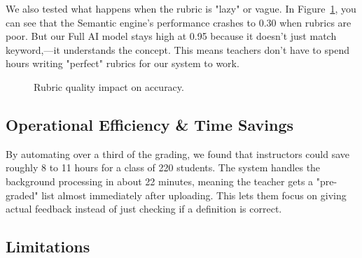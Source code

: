 \documentclass[conference]{IEEEtran}
\begin{document}
We also tested what happens when the rubric is "lazy" or vague. In Figure~\ref{fig:sensitivity}, you can see that the Semantic engine's performance crashes to 0.30 when rubrics are poor. But our Full AI model stays high at 0.95 because it doesn't just match keyword,—it understands the concept. This means teachers don't have to spend hours writing "perfect" rubrics for our system to work.
\vspace{-1ex}
\begin{figure}[H]
\centering
{}
\caption{Rubric quality impact on accuracy.}
\label{fig:sensitivity}
\end{figure}
\vspace{-1ex}

\subsection{Operational Efficiency & Time Savings}

By automating over a third of the grading, we found that instructors could save roughly 8 to 11 hours for a class of 220 students. The system handles the background processing in about 22 minutes, meaning the teacher gets a "pre-graded" list almost immediately after uploading. This lets them focus on giving actual feedback instead of just checking if a definition is correct.

\subsection{Limitations}
\end{document}
